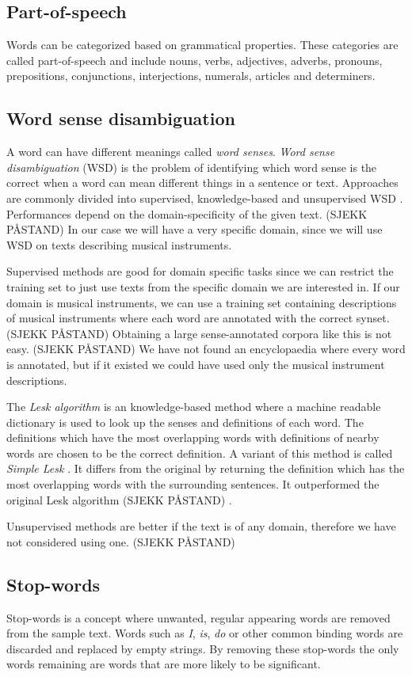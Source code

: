 \subsection{Part-of-speech}
Words can be categorized based on grammatical properties. These categories are called part-of-speech and include nouns, verbs, adjectives, adverbs, pronouns, prepositions, conjunctions, interjections, numerals, articles and determiners.

\subsection{Word sense disambiguation}
A word can have different meanings called \emph{word senses}. \emph{Word sense disambiguation} (WSD) is the problem of identifying which word sense is the correct when a word can mean different things in a sentence or text. Approaches are commonly divided into supervised, knowledge-based and unsupervised WSD \parencite{moro2014entity}. Performances depend on the domain-specificity of the given text. (SJEKK PÅSTAND) In our case we will have a very specific domain, since we will use WSD on texts describing musical instruments.

Supervised methods are good for domain specific tasks since we can restrict the training set to just use texts from the specific domain we are interested in. If our domain is musical instruments, we can use a training set containing descriptions of musical instruments where each word are annotated with the correct synset. (SJEKK PÅSTAND) Obtaining a large sense-annotated corpora like this is not easy. (SJEKK PÅSTAND) We have not found an encyclopaedia where every word is annotated, but if it existed we could have used only the musical instrument descriptions.

The \emph{Lesk algorithm} is an knowledge-based method where a machine readable dictionary is used to look up the senses and definitions of each word. The definitions which have the most overlapping words with definitions of nearby words are chosen to be the correct definition. \parencite{lesk1986automatic} A variant of this method is called \emph{Simple Lesk} \parencite{kilgarriff2000english}. It differs from the original by returning the definition which has the most overlapping words with the surrounding sentences. It outperformed the original Lesk algorithm (SJEKK PÅSTAND) \parencite{vasilescu2004evaluating}.

Unsupervised methods are better if the text is of any domain, therefore we have not considered using one. (SJEKK PÅSTAND)

\subsection{Stop-words}
Stop-words is a concept where unwanted, regular appearing words are removed from the sample text. Words such as \emph{I}, \emph{is}, \emph{do} or other common binding words are discarded and replaced by empty strings. By removing these stop-words the only words remaining are words that are more likely to be significant. 